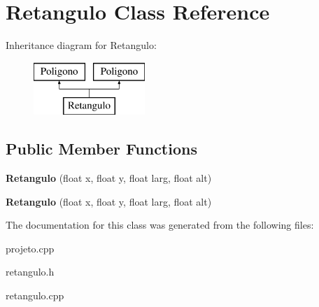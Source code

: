 \hypertarget{classRetangulo}{}\section{Retangulo Class Reference}
\label{classRetangulo}
Inheritance diagram for Retangulo\+:\begin{figure}[H]
\begin{center}
\leavevmode
\includegraphics[height=2.000000cm]{classRetangulo}
\end{center}
\end{figure}
\subsection*{Public Member Functions}
\begin{DoxyCompactItemize}
\item 
\mbox{\label{classRetangulo_a92ef3678e78c886880e62e181684104a}} 
{\bfseries Retangulo} (float x, float y, float larg, float alt)
\item 
\mbox{\label{classRetangulo_a92ef3678e78c886880e62e181684104a}} 
{\bfseries Retangulo} (float x, float y, float larg, float alt)
\end{DoxyCompactItemize}


The documentation for this class was generated from the following files\+:\begin{DoxyCompactItemize}
\item 
projeto.\+cpp\item 
retangulo.\+h\item 
retangulo.\+cpp\end{DoxyCompactItemize}
